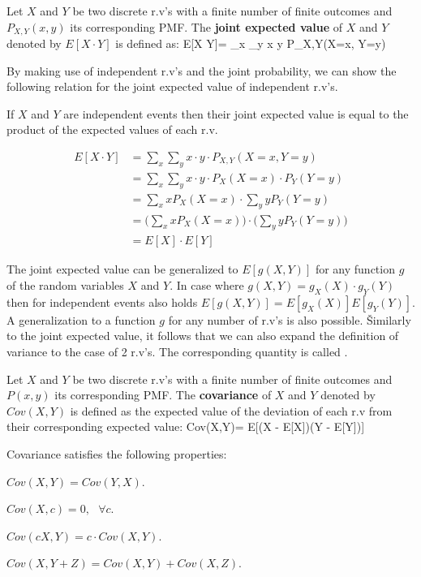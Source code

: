 Let $X$ and $Y$ be two discrete r.v's with a finite number of finite outcomes and $P_{X,Y}(x,y)$ its corresponding
PMF. The \textbf{joint expected value} of $X$ and $Y$ denoted by $E[X \cdot Y]$ is defined as:
\bse
E[X \cdot Y]= \sum _{x} \sum _{y} x \cdot y \cdot P_{X,Y}(X=x, Y=y)
\ese
\ed

By making use of independent r.v's and the joint probability, we can show the following relation for the joint
expected value of independent r.v's.

\bt[]
If $X$ and $Y$ are independent events then their joint expected value is equal to the product of the expected values
of each r.v.
\et

\bq
\begin{align*}
E[X \cdot Y] &= \sum _{x} \sum _{y} x \cdot y \cdot P_{X,Y}(X=x, Y=y) \\
&= \sum _{x} \sum _{y} x \cdot y \cdot P_{X}(X=x) \cdot P_{Y}(Y=y) \\
&= \sum _{x} x P_{X}(X=x) \cdot \sum _{y} y P_{Y}(Y=y) \\
&= \Big( \sum _{x} x P_{X}(X=x) \Big) \cdot \Big(\sum _{y} y P_{Y}(Y=y) \Big) \\
&= E[X] \cdot E[Y]
\end{align*}
\eq

The joint expected value can be generalized to $E[g(X,Y)]$ for any function $g$ of the random variables $X$ and $Y$.
In case where $g(X,Y) = g_{X}(X) \cdot g_{Y}(Y)$ then for independent events also holds $E[g(X,Y)] = E[g_{X}(X)]
E[g_{Y}(Y)]$. A generalization to a function $g$ for any number of r.v's is also possible. \v

Similarly to the joint expected value, it follows that we can also expand the definition of variance to the case of 2
r.v's. The corresponding quantity is called .

\bd[Covariance]
Let $X$ and $Y$ be two discrete r.v's with a finite number of finite outcomes and $P(x,y)$ its corresponding PMF. The
\textbf{covariance} of $X$ and $Y$ denoted by $Cov(X,Y)$ is defined as the expected value of the deviation of each r.v
from their corresponding expected value:
\bse
Cov(X,Y)= E[(X - E[X])(Y - E[Y])]
\ese
\ed

Covariance satisfies the following properties:
\bit
\item $Cov(X,Y) = Cov(Y,X)$.
\item $Cov(X, c) = 0, \:\:\: \forall c$.
\item $Cov(c X, Y) = c \cdot Cov(X, Y)$.
\item $Cov(X,Y+Z) = Cov(X,Y) + Cov(X,Z)$.
\eit

